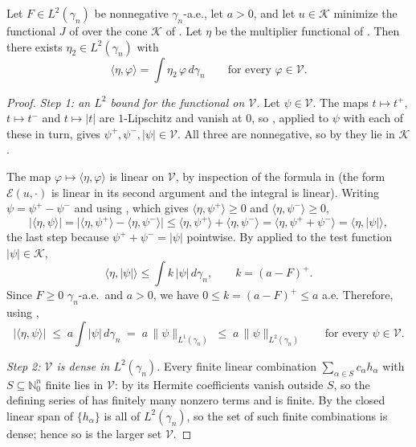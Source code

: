 \begin{lemma}
Let $F \in L^2(\gamma_n)$ be nonnegative $\gamma_n$-a.e., let $a > 0$, and let
$u \in \mathcal{K}$ minimize the functional $J$ of 
over the cone $\mathcal{K}$ of .  Let $\eta$ be the
multiplier functional of .  Then there exists
$\eta_2 \in L^2(\gamma_n)$ with
\[
  \langle \eta, \varphi\rangle = \int \eta_2\, \varphi \, d\gamma_n
  \qquad\text{for every } \varphi \in \mathcal{V} .
\]
\end{lemma}
\begin{proof}
\emph{Step 1: an $L^2$ bound for the functional on $\mathcal{V}$.}
Let $\psi \in \mathcal{V}$.  The maps $t \mapsto t^+$, $t\mapsto t^-$ and
$t \mapsto |t|$ are $1$-Lipschitz and vanish at $0$, so
, applied to $\psi$ with each of these in turn, gives
$\psi^+, \psi^-, |\psi| \in \mathcal{V}$.  All three are nonnegative, so by
 they lie in $\mathcal{K}$.

The map $\varphi \mapsto \langle \eta,\varphi\rangle$ is linear on $\mathcal{V}$,
by inspection of the formula in  (the form
$\mathcal{E}(u,\cdot)$ is linear in its second argument and the integral is
linear).  Writing $\psi = \psi^+ - \psi^-$ and using
, which gives
$\langle\eta,\psi^+\rangle \geq 0$ and $\langle\eta,\psi^-\rangle \geq 0$,
\[
  \bigl|\langle \eta, \psi\rangle\bigr|
    = \bigl|\langle\eta,\psi^+\rangle - \langle\eta,\psi^-\rangle\bigr|
    \leq \langle\eta,\psi^+\rangle + \langle\eta,\psi^-\rangle
    = \langle \eta, \psi^+ + \psi^-\rangle
    = \langle\eta, |\psi|\rangle ,
\]
the last step because $\psi^+ + \psi^- = |\psi|$ pointwise.  By
 applied to the test function $|\psi| \in \mathcal{K}$,
\[
  \langle\eta, |\psi|\rangle \leq \int k\,|\psi|\, d\gamma_n,
  \qquad k = (a-F)^+ .
\]
Since $F \geq 0$ $\gamma_n$-a.e.\ and $a > 0$, we have
$0 \leq k = (a-F)^+ \leq a$ a.e.  Therefore, using ,
\begin{equation*}
  \bigl|\langle\eta,\psi\rangle\bigr|
    \;\leq\; a \int |\psi|\, d\gamma_n
    \;=\; a\,\|\psi\|_{L^1(\gamma_n)}
    \;\leq\; a\,\|\psi\|_{L^2(\gamma_n)}
  \qquad\text{for every } \psi \in \mathcal{V}. \tag{1}
\end{equation*}

\emph{Step 2: $\mathcal{V}$ is dense in $L^2(\gamma_n)$.}
Every finite linear combination $\sum_{\alpha \in S} c_\alpha h_\alpha$ with
$S \subseteq \mathbb{N}_0^n$ finite lies in $\mathcal{V}$: by
 its Hermite coefficients vanish outside $S$, so the
defining series of  has finitely many nonzero terms and is
finite.  By  the closed linear span of
$\{h_\alpha\}$ is all of $L^2(\gamma_n)$, so the set of such finite combinations
is dense; hence so is the larger set $\mathcal{V}$.


\end{proof}
